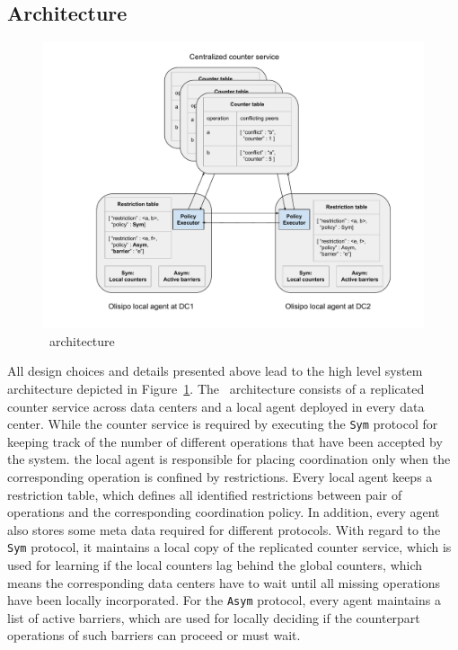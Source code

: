 \subsection{Architecture}
\label{sec:tool}
\begin{figure}[t!]
\centering
\includegraphics[width=\columnwidth]{./figures/por/tool_support.pdf}
\caption{\coordtool\ architecture}
\label{fig:tooldesign}
\end{figure}

All design choices and details presented above lead to the high level system architecture 
depicted in Figure~\ref{fig:tooldesign}. The \coordtool\ architecture consists of a replicated counter service across data centers and a local agent deployed
in every data center. While the counter service is required by executing the {\tt Sym} protocol
for keeping track of the number of different operations that have been accepted by the system.
the local agent is responsible for placing coordination only when the corresponding
operation is confined by restrictions. Every local agent keeps a restriction table, which defines
all identified restrictions between pair of operations and the corresponding coordination policy.
In addition, every agent also stores some meta data required for different protocols. With regard
to the {\tt Sym} protocol, it maintains a local copy of the replicated counter service, which is used
for learning if the local counters lag behind the global counters, which means
the corresponding data centers have to wait until all missing operations have been locally
incorporated. For the {\tt Asym} protocol, every agent maintains a list of active barriers, which
are used for locally deciding if the counterpart operations of such barriers can proceed or must wait.

